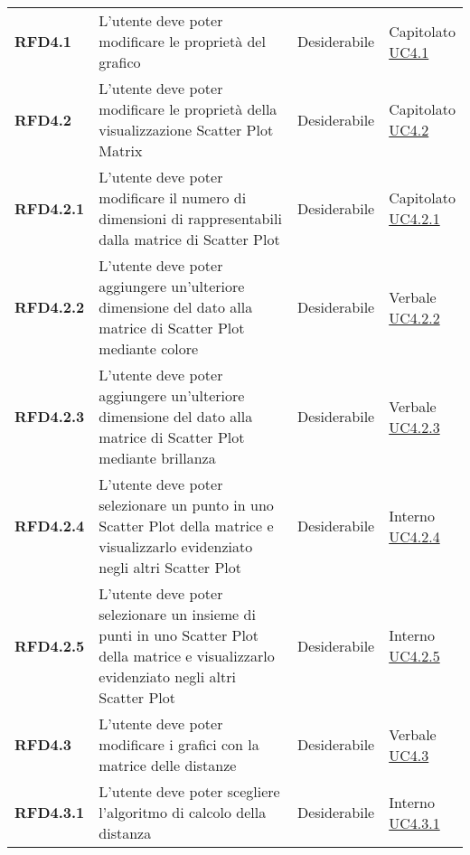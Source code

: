 \begin{longtable}[H]{>{\raggedright\bfseries}m{20mm} >{\raggedright}m{90mm} >{\raggedright}m{28mm} >{\raggedright\arraybackslash}m{30mm}}
    RFD4.1
    & L'utente deve poter modificare le proprietà del grafico
    & Desiderabile
    & \makecell{ Capitolato \\ \hyperref[ssub:uc4.1]{UC4.1} }\\

    RFD4.2
    & L'utente deve poter modificare le proprietà della visualizzazione Scatter Plot Matrix
    & Desiderabile
    & \makecell{ Capitolato \\ \hyperref[ssub:uc4.2]{UC4.2} }\\

    RFD4.2.1
    & L'utente deve poter modificare il numero di dimensioni di rappresentabili dalla matrice di Scatter Plot
    & Desiderabile
    & \makecell{ Capitolato \\ \hyperref[par:uc4.2.1]{UC4.2.1} }\\

    RFD4.2.2
    & L'utente deve poter aggiungere un'ulteriore dimensione del dato alla matrice di Scatter Plot mediante colore
    & Desiderabile
    & \makecell{ Verbale \\ \hyperref[par:uc4.2.2]{UC4.2.2} }\\

    RFD4.2.3
    & L'utente deve poter aggiungere un'ulteriore dimensione del dato alla matrice di Scatter Plot mediante brillanza
    & Desiderabile
    & \makecell{ Verbale \\ \hyperref[par:uc4.2.3]{UC4.2.3} }\\

    RFD4.2.4
    & L'utente deve poter selezionare un punto in uno Scatter Plot della matrice e visualizzarlo evidenziato negli
    altri Scatter Plot
    & Desiderabile
    & \makecell{ Interno \\ \hyperref[par:uc4.2.4]{UC4.2.4} }\\

    RFD4.2.5
    & L'utente deve poter selezionare un insieme di punti in uno Scatter Plot della matrice e visualizzarlo evidenziato
    negli altri Scatter Plot
    & Desiderabile
    & \makecell{ Interno \\ \hyperref[par:uc4.2.5]{UC4.2.5} }\\

    RFD4.3
    & L'utente deve poter modificare i grafici con la matrice delle distanze
    & Desiderabile
    & \makecell{ Verbale \\ \hyperref[ssub:uc4.3]{UC4.3} }\\

    RFD4.3.1
    & L'utente deve poter scegliere l'algoritmo di calcolo della distanza
    & Desiderabile
    & \makecell{ Interno \\ \hyperref[par:uc4.3.1]{UC4.3.1} }\\


\end{longtable}
